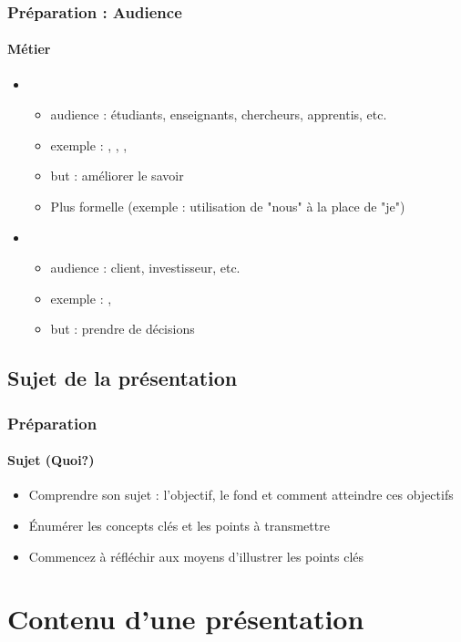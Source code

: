 \documentclass[xcolor=table, usenames,dvipsnames]{beamer}
\begin{document}
\begin{frame}
\frametitle{Préparation : Audience}
\framesubtitle{Métier}

\begin{itemize}
	\item {}
	\begin{itemize}
		\item audience : étudiants, enseignants, chercheurs, apprentis, etc.
		\item exemple : , , , 
		\item but : améliorer le savoir
		\item Plus formelle (exemple : utilisation de "nous" à la place de "je")
	\end{itemize}
	\item {}
	\begin{itemize}
		\item audience : client, investisseur, etc.
		\item exemple : , 
		\item but : prendre de décisions
	\end{itemize}
\end{itemize}

\end{frame}

\subsection{Sujet de la présentation}

\begin{frame}
\frametitle{Préparation}
\framesubtitle{Sujet (Quoi?)}

\begin{itemize}
	\item Comprendre son sujet : l'objectif, le fond et comment atteindre ces objectifs
	\item Énumérer les concepts clés et les points à transmettre
	\item Commencez à réfléchir aux moyens d'illustrer les points clés
\end{itemize}

\end{frame}

\section{Contenu d'une présentation}
\end{document}

